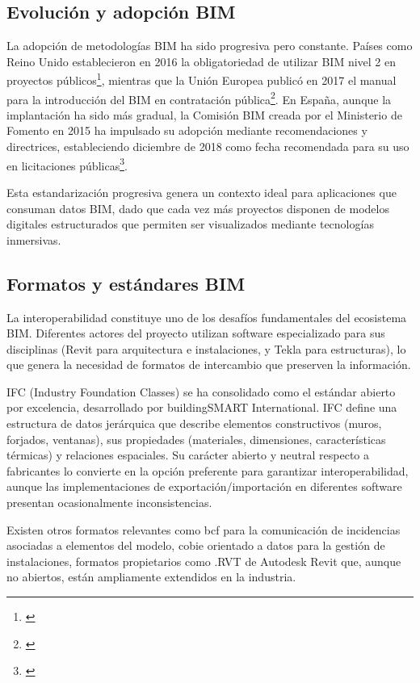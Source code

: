 \subsection{Evolución y adopción BIM}

La adopción de metodologías BIM ha sido progresiva pero constante. Países como Reino Unido establecieron en 2016 la obligatoriedad de utilizar BIM nivel 2 en proyectos públicos\footnote{\cite{ukcabinet2016strategy}}, mientras que la Unión Europea publicó en 2017 el manual para la introducción del BIM en contratación pública\footnote{\cite{eubim2017handbook}}. En España, aunque la implantación ha sido más gradual, la Comisión BIM creada por el Ministerio de Fomento en 2015 ha impulsado su adopción mediante recomendaciones y directrices, estableciendo diciembre de 2018 como fecha recomendada para su uso en licitaciones públicas\footnote{\cite{fomento2015comision}}.

Esta estandarización progresiva genera un contexto ideal para aplicaciones que consuman datos BIM, dado que cada vez más proyectos disponen de modelos digitales estructurados que permiten ser visualizados mediante tecnologías inmersivas.

\subsection{Formatos y estándares BIM}

La interoperabilidad constituye uno de los desafíos fundamentales del ecosistema BIM. Diferentes actores del proyecto utilizan software especializado para sus disciplinas (Revit para arquitectura e instalaciones, y Tekla para estructuras), lo que genera la necesidad de formatos de intercambio que preserven la información.

IFC (Industry Foundation Classes) se ha consolidado como el estándar abierto por excelencia, desarrollado por buildingSMART International. IFC define una estructura de datos jerárquica que describe elementos constructivos (muros, forjados, ventanas), sus propiedades (materiales, dimensiones, características térmicas) y relaciones espaciales. Su carácter abierto y neutral respecto a fabricantes lo convierte en la opción preferente para garantizar interoperabilidad, aunque las implementaciones de exportación/importación en diferentes software presentan ocasionalmente inconsistencias.

Existen otros formatos relevantes como \gls{bcf} para la comunicación de incidencias asociadas a elementos del modelo, \gls{cobie} orientado a datos para la gestión de instalaciones, formatos propietarios como .RVT de Autodesk Revit que, aunque no abiertos, están ampliamente extendidos en la industria.

